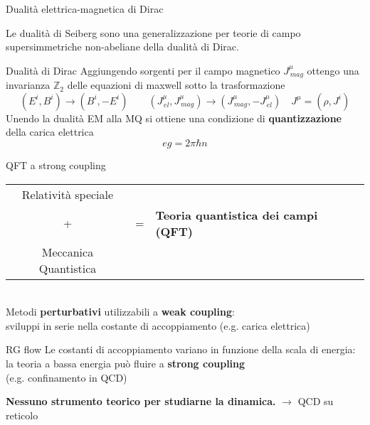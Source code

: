 \documentclass[10pt,compress,usenames,dvipsnames]{beamer}
\begin{document}
\begin{frame}{Dualità elettrica-magnetica di Dirac}

Le dualità di Seiberg sono una \alert{generalizzazione} per teorie di campo \alert{supersimmetriche} \alert{ non-abeliane} della dualità di Dirac.
\begin{block}{Dualità di Dirac}
Aggiungendo sorgenti per il campo magnetico $J_{\, mag}^{\mu}$ ottengo una invarianza $\mathbb{Z}_2$ delle equazioni di maxwell sotto la trasformazione
\begin{equation*}
 \left( {E}^i, {B}^i \right) \longrightarrow \left({B}^i, - {E}^i \right)
 \qquad \left( J_{\, el}^{\mu }, J_{\, mag}^{\mu} \right) \longrightarrow \left( 
 J_{\, mag}^{\mu},  - J_{\, el}^{\mu }
 \right)
 \quad  J^{\mu} = ( \rho , J^i)
\end{equation*}
Unendo la dualità EM alla MQ si ottiene una condizione di \alert{\bfseries quantizzazione} della carica elettrica
$$
e g  = 2 \pi \hbar n
$$
\vspace{-0,3cm}
\end{block}

\vspace{0.5cm}
\end{frame}














\begin{frame}{QFT a strong coupling}
\begin{tabular}{c l l }
Relatività speciale  & \\[0,1cm]
{\Large +} & {\Large=}  & \alert{ \bfseries \large Teoria quantistica dei campi (QFT) }\\
Meccanica Quantistica & \\
\end{tabular}
\\
\vspace{0.3cm}
Metodi {\bfseries perturbativi} utilizzabili a \alert{\bfseries weak coupling}: \\
sviluppi in serie nella costante di accoppiamento (\small e.g.\alert { carica elettrica}) \\

\begin{block}{RG flow}
Le costanti di accoppiamento variano in funzione della scala di energia:	\\
la teoria a bassa energia può fluire a \alert{ \bfseries strong coupling} \\
(e.g. confinamento in QCD)
\end{block}

\alert{\bfseries Nessuno strumento teorico per studiarne la dinamica.}
$\longrightarrow$ QCD su reticolo

\end{frame}
\end{document}
